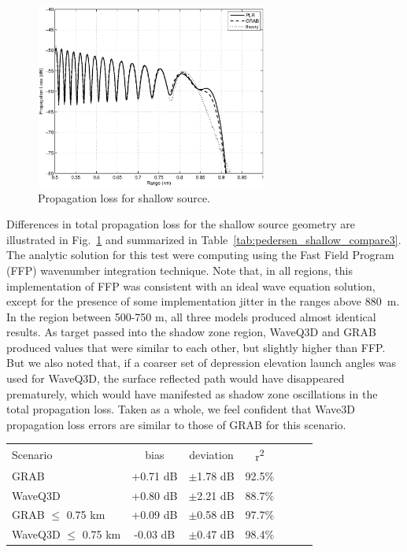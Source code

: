 \documentclass{ws-jca}
\begin{document}
\begin{figure}[th]
	\centerline{\includegraphics[width=3in]{pedersen_shallow_compare3.eps}} 
	\vspace*{8pt}
	\caption{Propagation loss for shallow source. 
	\label{fig:pedersen_shallow_compare3}}
\end{figure}
Differences in total propagation loss for the shallow source geometry are
illustrated in Fig.~\ref{fig:pedersen_shallow_compare3} and summarized in
Table~\ref{tab:pedersen_shallow_compare3}. The analytic solution for this
test were computing using the Fast Field Program (FFP) wavenumber
integration technique.\cite{DiNapoli1980,Brekhovskikh1980} Note that, in
all regions, this implementation of FFP was consistent with an ideal wave
equation solution, except for the presence of some implementation jitter in
the ranges above 880~m. In the region between 500-750 m, all three models
produced almost identical results. As target passed into the shadow zone
region, WaveQ3D and GRAB produced values that were similar to each other,
but slightly higher than FFP. But we also noted that, if a coarser set of
depression elevation launch angles was used for WaveQ3D, the surface
reflected path would have disappeared prematurely, which would have
manifested as shadow zone oscillations in the total propagation loss. Taken
as a whole, we feel confident that Wave3D propagation loss errors are
similar to those of GRAB for this scenario.
\begin{table}[th]
	{\begin{tabular}{@{}lcccccc@{}} \toprule
		Scenario & bias & deviation & r\textsuperscript{2} \\ \colrule
		GRAB & +0.71 dB & \(\pm\)1.78 dB & 92.5\% \\
		WaveQ3D & +0.80 dB & \(\pm\)2.21 dB & 88.7\% \\
		GRAB \(\leq\) 0.75 km & +0.09 dB & \(\pm\)0.58 dB & 97.7\% \\
		WaveQ3D \(\leq\) 0.75 km & -0.03 dB & \(\pm\)0.47 dB & 98.4\% \\
	\end{tabular}}
\end{table}
\end{document}
